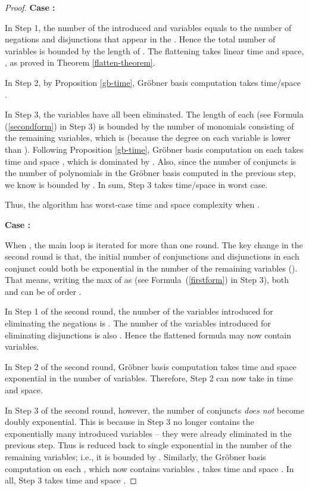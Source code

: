 \documentclass[envcountsect]{llncs}
\begin{document}
{{\begin{proof}
 {\bf Case :}

In Step 1, the number of the introduced  and  variables equals to the number of negations and disjunctions that appear in the . Hence the total number of variables is bounded by the length of . The flattening takes linear time and space, , as proved in Theorem \ref{flatten-theorem}.

In Step 2, by Proposition \ref{gb-time}, Gr\"obner basis computation takes time/space . 

In Step 3, the variables  have all been eliminated. The length of each  (see Formula (\ref{secondform}) in Step 3) is bounded by the number of monomials consisting of the remaining variables, which is  (because the degree on each variable is lower than ). Following Proposition \ref{gb-time}, Gr\"obner basis computation on each  takes time and space , which is dominated by . Also, since the number  of conjuncts is the number of polynomials in the Gr\"obner basis computed in the previous step, we know  is bounded by . In sum, Step 3 takes  time/space in worst case.

Thus, the algorithm has worst-case time and space complexity  when .

 {\bf Case :}

When , the main loop is iterated for more than one round. The key change in the second round is that, the initial number of conjunctions and disjunctions in each conjunct could both be exponential in the number of the remaining variables (). That means, writing the max of  as  (see Formula~(\ref{firstform}) in Step 3), both  and  can be of order . 

In Step 1 of the second round, the number of the  variables introduced for eliminating the negations is . The number of the  variables introduced for eliminating disjunctions is also . Hence the flattened formula may now contain  variables. 

In Step 2 of the second round, Gr\"obner basis computation takes time and space exponential in the number of variables. Therefore, Step 2 can now take  in time and space. 

In Step 3 of the second round, however, the number of conjuncts  {\em does not} become doubly exponential. This is because  in Step 3 no longer contains the exponentially many introduced variables -- they were already eliminated in the previous step. Thus  is reduced back to single exponential in the number of the remaining variables; i.e., it is bounded by . Similarly, the Gr\"obner basis computation on each , which now contains variables ,  takes time and space . In all, Step 3 takes time and space .


\end{proof}}}
\end{document}
